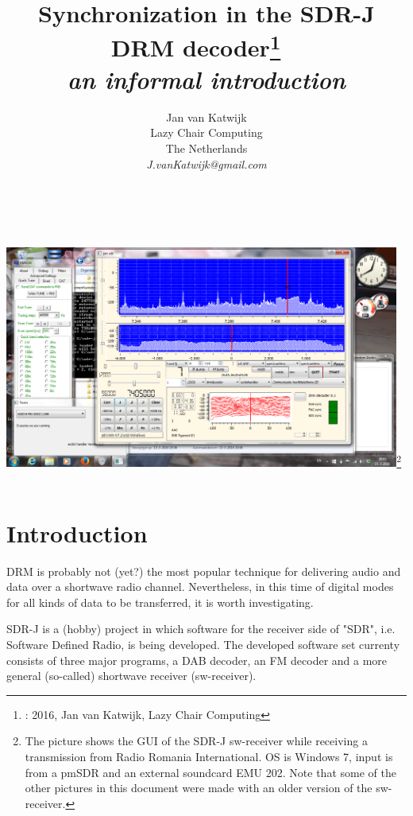 \documentclass[11pt]{article}
\begin{document}
\title{Synchronization in the SDR-J DRM decoder\footnote{\textcopyright: 2016, Jan van Katwijk, Lazy Chair Computing}
\ \\
{\small {\em an informal introduction}}
}
\author{
Jan van Katwijk\\
Lazy Chair Computing \\
The Netherlands\\
{\em J.vanKatwijk@gmail.com}\\
}
\maketitle
\ \\
\ \\
\includegraphics[width=130mm]{Screenshot-extio-pmsdr-sw.png}\footnote{The picture shows
the GUI of the SDR-J sw-receiver while receiving a transmission
from Radio Romania International. OS is Windows 7, input is from a pmSDR and an 
external soundcard EMU 202. Note that some of the other pictures in this
document were made with an older version of the sw-receiver.}
\ \\
\section{Introduction}
DRM is probably not (yet?) the most popular technique
for delivering audio and data over a shortwave radio channel.
Nevertheless, in this time of digital modes for all
kinds of data to be transferred, it is worth investigating.

SDR-J is a (hobby) project in which software for the receiver side
of "SDR", i.e. Software Defined Radio, is being developed.
The developed software set
currenty consists of three  major programs,
a DAB decoder, an FM decoder and a more general (so-called)
shortwave receiver (sw-receiver).
\end{document}
